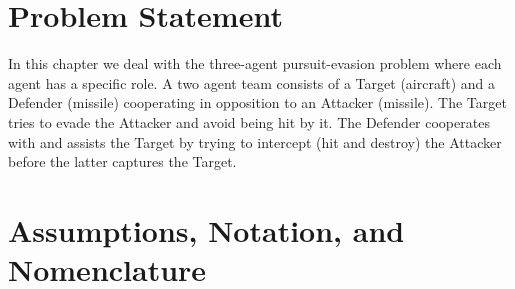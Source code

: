 \label{ATD_problem}

\section{Problem Statement}
In this chapter we deal with the three-agent pursuit-evasion problem where each agent has a specific role. A two agent team consists of a Target (aircraft) and a Defender (missile) cooperating in opposition to an Attacker (missile). The Target tries to evade the Attacker and avoid being hit by it. The Defender cooperates with and assists the Target by trying to intercept (hit and destroy) the Attacker before the latter captures the Target.


\section{Assumptions, Notation, and Nomenclature}
